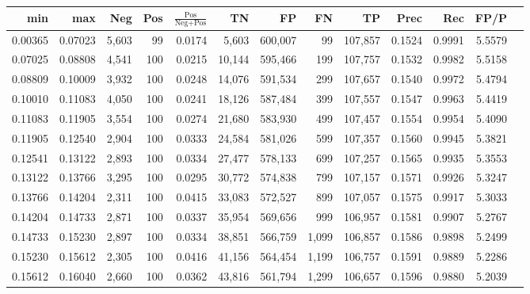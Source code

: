 \begin{tabular}{rrrrrrrrrrrrr}
\toprule
    min &     max &   Neg & Pos & $\frac{\text{Pos}}{\text{Neg}+\text{Pos}}$ &      TN &      FP &      FN &      TP &   Prec &    Rec &   FP/P \\
\midrule
0.00365 & 0.07023 & 5,603 &  99 &                                     0.0174 &   5,603 & 600,007 &      99 & 107,857 & 0.1524 & 0.9991 & 5.5579 \\
0.07025 & 0.08808 & 4,541 & 100 &                                     0.0215 &  10,144 & 595,466 &     199 & 107,757 & 0.1532 & 0.9982 & 5.5158 \\
0.08809 & 0.10009 & 3,932 & 100 &                                     0.0248 &  14,076 & 591,534 &     299 & 107,657 & 0.1540 & 0.9972 & 5.4794 \\
0.10010 & 0.11083 & 4,050 & 100 &                                     0.0241 &  18,126 & 587,484 &     399 & 107,557 & 0.1547 & 0.9963 & 5.4419 \\
0.11083 & 0.11905 & 3,554 & 100 &                                     0.0274 &  21,680 & 583,930 &     499 & 107,457 & 0.1554 & 0.9954 & 5.4090 \\
0.11905 & 0.12540 & 2,904 & 100 &                                     0.0333 &  24,584 & 581,026 &     599 & 107,357 & 0.1560 & 0.9945 & 5.3821 \\
0.12541 & 0.13122 & 2,893 & 100 &                                     0.0334 &  27,477 & 578,133 &     699 & 107,257 & 0.1565 & 0.9935 & 5.3553 \\
0.13122 & 0.13766 & 3,295 & 100 &                                     0.0295 &  30,772 & 574,838 &     799 & 107,157 & 0.1571 & 0.9926 & 5.3247 \\
0.13766 & 0.14204 & 2,311 & 100 &                                     0.0415 &  33,083 & 572,527 &     899 & 107,057 & 0.1575 & 0.9917 & 5.3033 \\
0.14204 & 0.14733 & 2,871 & 100 &                                     0.0337 &  35,954 & 569,656 &     999 & 106,957 & 0.1581 & 0.9907 & 5.2767 \\
0.14733 & 0.15230 & 2,897 & 100 &                                     0.0334 &  38,851 & 566,759 &   1,099 & 106,857 & 0.1586 & 0.9898 & 5.2499 \\
0.15230 & 0.15612 & 2,305 & 100 &                                     0.0416 &  41,156 & 564,454 &   1,199 & 106,757 & 0.1591 & 0.9889 & 5.2286 \\
0.15612 & 0.16040 & 2,660 & 100 &                                     0.0362 &  43,816 & 561,794 &   1,299 & 106,657 & 0.1596 & 0.9880 & 5.2039 \\

\end{tabular}
